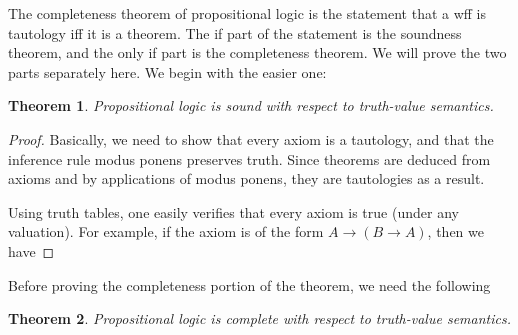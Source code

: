 \documentclass[12pt]{article}
\newtheorem{thm}{Theorem}
\begin{document}
The completeness theorem of propositional logic is the statement that a wff is tautology iff it is a theorem.  The if part of the statement is the soundness theorem, and the only if part is the completeness theorem.  We will prove the two parts separately here.  We begin with the easier one:

\begin{thm} Propositional logic is sound with respect to truth-value semantics. \end{thm}
\begin{proof}
Basically, we need to show that every axiom is a tautology, and that the inference rule modus ponens preserves truth.  Since theorems are deduced from axioms and by applications of modus ponens, they are tautologies as a result.

Using truth tables, one easily verifies that every axiom is true (under any valuation).  For example, if the axiom is of the form $A\to (B\to A)$, then we have

\end{proof}

Before proving the completeness portion of the theorem, we need the following 

\begin{thm} Propositional logic is complete with respect to truth-value semantics. \end{thm}


\end{document}
